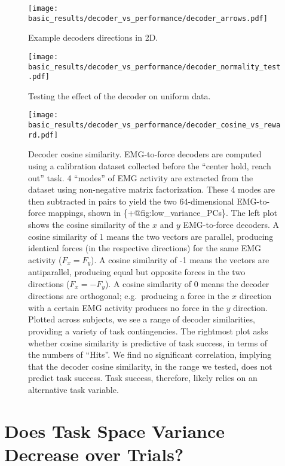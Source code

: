 \documentclass[../main.tex]{subfiles}
\begin{document}
\begin{figure}[H]
    \centering
    \texttt{[image: basic\_results/decoder\_vs\_performance/decoder\_arrows.pdf]}
    \caption[Example decoder directions in 2D.]{Example decoders directions in 2D.}\label{fig:decoder_arrows}
\end{figure}

\begin{figure}[H]
    \centering
    \texttt{[image: basic\_results/decoder\_vs\_performance/decoder\_normality\_test.pdf]}
    \caption[Decoder normality testing]{Testing the effect of the decoder on uniform data.}\label{fig:decoder_normality}
\end{figure}

\begin{figure}[H]
    \centering
    \texttt{[image: basic\_results/decoder\_vs\_performance/decoder\_cosine\_vs\_reward.pdf]}
    \caption[Decoder axis similarity versus reward]{Decoder cosine similarity. EMG-to-force decoders are computed using a calibration dataset collected before the ``center hold, reach out'' task. 4 ``modes'' of EMG activity are extracted from the dataset using non-negative matrix factorization. These 4 modes are then subtracted in pairs to yield the two 64-dimensional EMG-to-force mappings, shown in \{+@fig:low\_variance\_PCs\}. The left plot shows the cosine similarity of the $x$ and $y$ EMG-to-force decoders. A cosine similarity of 1 means the two vectors are parallel, producing identical forces (in the respective directions) for the same EMG activity ($F_x = F_y$). A cosine similarity of -1 means the vectors are antiparallel, producing equal but opposite forces in the two directions ($F_x = -F_y$). A cosine similarity of 0 means the decoder directions are orthogonal; e.g.~producing a force in the $x$ direction with a certain EMG activity produces no force in the $y$ direction. Plotted across subjects, we see a range of decoder similarities, providing a variety of task contingencies. The rightmost plot asks whether cosine similarity is predictive of task success, in terms of the numbers of ``Hits''. We find no significant correlation, implying that the decoder cosine similarity, in the range we tested, does not predict task success. Task success, therefore, likely relies on an alternative task variable.}\label{fig:decoder_cosine_vs_reward}
\end{figure}



\section{Does Task Space Variance Decrease over Trials?}
\end{document}
